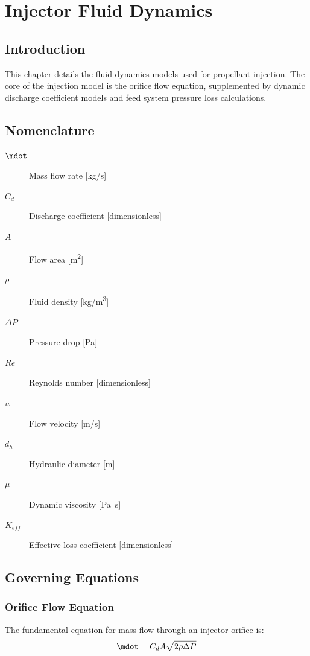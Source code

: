 \section{Injector Fluid Dynamics}

\subsection{Introduction}
This chapter details the fluid dynamics models used for propellant injection. The core of the injection model is the orifice flow equation, supplemented by dynamic discharge coefficient models and feed system pressure loss calculations.

\subsection{Nomenclature}
\begin{description}
    \item[\(\mdot\)] Mass flow rate [\si{kg/s}]
    \item[\(C_d\)] Discharge coefficient [dimensionless]
    \item[\(A\)] Flow area [\si{m^2}]
    \item[\(\rho\)] Fluid density [\si{kg/m^3}]
    \item[\(\Delta P\)] Pressure drop [\si{Pa}]
    \item[\(Re\)] Reynolds number [dimensionless]
    \item[\(u\)] Flow velocity [\si{m/s}]
    \item[\(d_h\)] Hydraulic diameter [\si{m}]
    \item[\(\mu\)] Dynamic viscosity [\si{Pa.s}]
    \item[\(K_{eff}\)] Effective loss coefficient [dimensionless]
\end{description}

\subsection{Governing Equations}

\subsubsection{Orifice Flow Equation}
The fundamental equation for mass flow through an injector orifice is:
\begin{equation}
\mdot = C_d A \sqrt{2 \rho \Delta P}
\end{equation}


